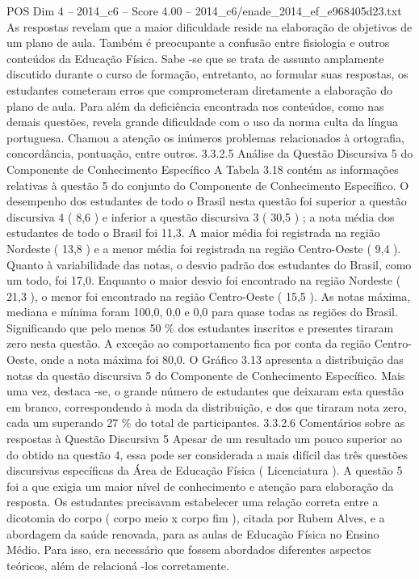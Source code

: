 \begin{textsample}{POS Dim 4 – 2014\_c6 – Score 4.00 – 2014\_c6/enade\_2014\_ef\_e968405d23.txt}
As respostas revelam que a maior dificuldade reside na elaboração de objetivos de um plano de aula.
Também é preocupante a confusão entre fisiologia e outros conteúdos da Educação Física.
Sabe -se que se trata de assunto amplamente discutido durante o curso de formação, entretanto, ao formular suas respostas, os estudantes cometeram erros que comprometeram diretamente a elaboração do plano de aula.
Para além da deficiência encontrada nos conteúdos, como nas demais questões, revela grande dificuldade com o uso da norma culta da língua portuguesa.
Chamou a atenção os inúmeros problemas relacionados à ortografia, concordância, pontuação, entre outros. 3.3.2.5 Análise da Questão Discursiva 5 do Componente de Conhecimento Específico A Tabela 3.18 contém as informações relativas à questão 5 do conjunto do Componente de Conhecimento Específico.
O desempenho dos estudantes de todo o Brasil nesta questão foi superior a questão discursiva 4 ( 8,6 ) e inferior a questão discursiva 3 ( 30,5 ) ; a nota média dos estudantes de todo o Brasil foi 11,3.
A maior média foi registrada na região Nordeste ( 13,8 ) e a menor média foi registrada na região Centro-Oeste ( 9,4 ).
Quanto à variabilidade das notas, o desvio padrão dos estudantes do Brasil, como um todo, foi 17,0.
Enquanto o maior desvio foi encontrado na região Nordeste ( 21,3 ), o menor foi encontrado na região Centro-Oeste ( 15,5 ).
As notas máxima, mediana e mínima foram 100,0, 0,0 e 0,0 para quase todas as regiões do Brasil.
Significando que pelo menos 50 \% dos estudantes inscritos e presentes tiraram zero nesta questão.
A exceção ao comportamento fica por conta da região Centro-Oeste, onde a nota máxima foi 80,0.
O Gráfico 3.13 apresenta a distribuição das notas da questão discursiva 5 do Componente de Conhecimento Específico.
Mais uma vez, destaca -se, o grande número de estudantes que deixaram esta questão em branco, correspondendo à moda da distribuição, e dos que tiraram nota zero, cada um superando 27 \% do total de participantes. 3.3.2.6 Comentários sobre as respostas à Questão Discursiva 5 Apesar de um resultado um pouco superior ao do obtido na questão 4, essa pode ser considerada a mais difícil das três questões discursivas específicas da Área de Educação Física ( Licenciatura ).
A questão 5 foi a que exigia um maior nível de conhecimento e atenção para elaboração da resposta.
Os estudantes precisavam estabelecer uma relação correta entre a dicotomia do corpo ( corpo meio x corpo fim ), citada por Rubem Alves, e a abordagem da saúde renovada, para as aulas de Educação Física no Ensino Médio.
Para isso, era necessário que fossem abordados diferentes aspectos teóricos, além de relacioná -los corretamente.

\end{textsample}
